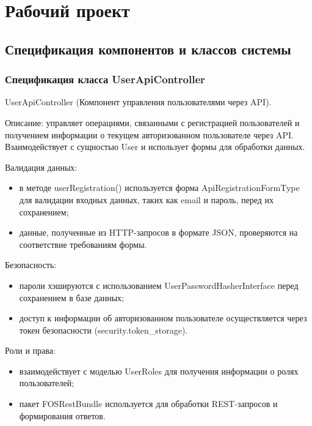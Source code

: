 \section{Рабочий проект}
\subsection{Спецификация компонентов и классов системы}

\subsubsection{Спецификация класса UserApiController}

UserApiController (Компонент управления пользователями через API).

Описание: управляет операциями, связанными с регистрацией пользователей и получением информации о текущем авторизованном пользователе через API. Взаимодействует с сущностью User и использует формы для обработки данных.

Валидация данных:
\begin{itemize}
	\item в методе userRegistration() используется форма ApiRegistrationFormType для валидации входных данных, таких как email и пароль, перед их сохранением;
	\item данные, полученные из HTTP-запросов в формате JSON, проверяются на соответствие требованиям формы.
\end{itemize}

Безопасность:
\begin{itemize}
	\item пароли хэшируются с использованием UserPasswordHasherInterface перед сохранением в базе данных;
	\item доступ к информации об авторизованном пользователе осуществляется через токен безопасности (security.token{\_}storage).
\end{itemize}

Роли и права:
\begin{itemize}
	\item взаимодействует с моделью UserRoles для получения информации о ролях пользователей;
	\item пакет FOSRestBundle используется для обработки REST-запросов и формирования ответов.
\end{itemize}

